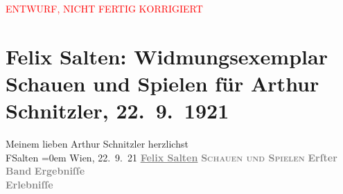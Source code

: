 
\begin{center}
            \textcolor{red}{ENTWURF, NICHT FERTIG KORRIGIERT}
                      \end{center}
            
         \renewcommand{\erwaehnteInstitutionen}{Institutionen: Wiener Literarische Anstalt}
         \renewcommand{\erwaehnteOrte}{Orte: Leipzig, Wien}
         \renewcommand{\erwaehnteWerke}{Werke: Schauen und Spielen. Studien zur Kritik des modernen Theaters, Schauen und Spielen. Studien zur Kritik des modernen Theaters. Erster Band. Ergebnisse Erlebnisse}
               \section[Felix Salten: Widmungsexemplar Schauen und Spielen für Arthur Schnitzler, 22. 9. 1921]{ Felix Salten: Widmungsexemplar Schauen und Spielen für Arthur
               Schnitzler, 22. 9. 1921}\nopagebreak{}\rehead{ }\begin{ledgroupsized}[t]{13cm}\normalsize\beginnumbering \toendnotes[C]{\smallbreak\pagebreak[2]} 
\pstart
           \noindent{}{\pb}Meinem lieben Arthur Schnitzler\pend
           \pstart
           herzlichst{\\[\baselineskip]}\spacefill\mbox{FSalten}\pend
           \leftskip=0em{}\pstart
           Wien, 22. 9. 21\pend
           {\bigskip}\pstart
           \noindent{}\centering{}\textcolor{gray}{\textbf{\uline{Felix Salten}}}\pend
           \pstart
           \noindent{}\centering{}\textcolor{gray}{\textbf{\textsc{Schauen und Spielen}}}\pend
           \pstart
           \noindent{}\centering{}\textcolor{gray}{\textbf{Erſter Band}}\pend
           \pstart
           \noindent{}\centering{}\textcolor{gray}{\textbf{Ergebniſſe{\\}Erlebniſſe}}
\end{ledgroupsized}
